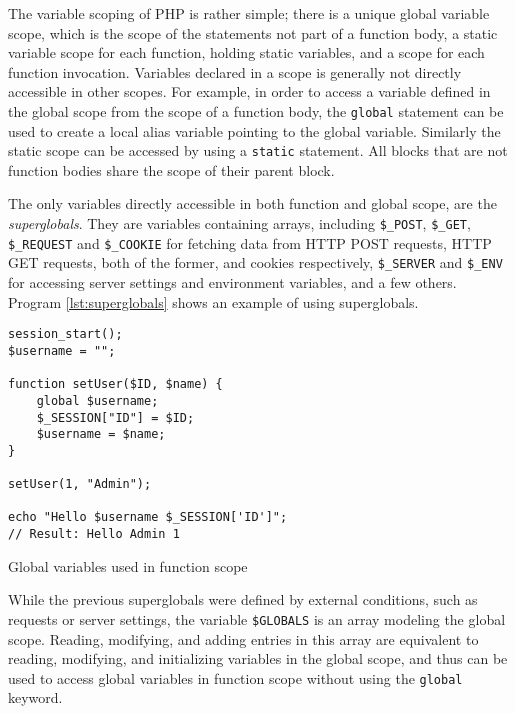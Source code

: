 The variable scoping of PHP is rather simple; there is a unique global variable scope, which is the scope of the statements not part of a function body, a static variable scope for each function, holding static variables, and a scope for each function invocation. Variables declared in a scope is generally not directly accessible in other scopes. For example, in order to access a variable defined in the global scope from the scope of a function body, the \texttt{global} statement can be used to create a local alias variable pointing to the global variable. Similarly the static scope can be accessed by using a \texttt{static} statement. All blocks that are not function bodies share the scope of their parent block.

The only variables directly accessible in both function and global scope, are the \emph{superglobals}. They are variables containing arrays, including \texttt{\$\_POST}, \texttt{\$\_GET}, \texttt{\$\_REQUEST} and \texttt{\$\_COOKIE} for fetching data from HTTP POST requests, HTTP GET requests, both of the former, and cookies respectively, \texttt{\$\_SERVER} and \texttt{\$\_ENV} for accessing server settings and environment variables, and a few others. Program \ref{lst:superglobals} shows an example of using superglobals.

\begin{program}
\begin{lstlisting}
session_start();
$username = "";

function setUser($ID, $name) {
    global $username;
    $_SESSION["ID"] = $ID;
    $username = $name;
}

setUser(1, "Admin");

echo "Hello $username $_SESSION['ID']"; 
// Result: Hello Admin 1
\end{lstlisting}
\caption{Global variables used in function scope}
\label{lst:superglobals}
\end{program}

While the previous superglobals were defined by external conditions, such as requests or server settings, the variable \texttt{\$GLOBALS} is an array modeling the global scope. Reading, modifying, and adding entries in this array are equivalent to reading, modifying, and initializing variables in the global scope, and thus can be used to access global variables in function scope without using the \texttt{global} keyword.


